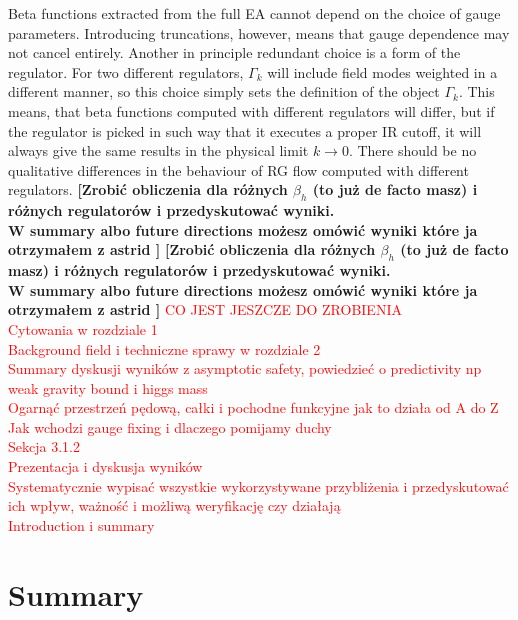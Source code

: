 \documentclass[11pt, a4paper]{article}
\newcommand{\jhkbf}[1]{\textbf{\color{red} [#1]}}
\newcommand{\jhkbf}[1]{\textbf{\color{red} [#1]}}
\begin{document}
Beta functions extracted from the full EA cannot depend on the choice of gauge parameters.
Introducing truncations, however, means that gauge dependence may not cancel entirely.
Another in principle redundant choice is a form of the regulator. For two different regulators,
$\Gamma_k$ will include field modes weighted in a different manner, so this choice simply
sets the definition of the object $\Gamma_k$. 
This means, that beta functions computed with different regulators will differ, but
if the regulator is picked in such way that it executes a proper IR cutoff,
it will always give the same results in the physical limit $k \rightarrow 0$. There should be no
qualitative differences in the behaviour of RG flow computed with different regulators.
\jhkbf{Zrobić obliczenia dla różnych $\beta_h$ (to już de facto masz) i różnych regulatorów i przedyskutować wyniki.\\ 
W summary albo future directions możesz omówić wyniki które ja otrzymałem z astrid
}
\jhkbf{Zrobić obliczenia dla różnych $\beta_h$ (to już de facto masz) i różnych regulatorów i przedyskutować wyniki.\\ 
W summary albo future directions możesz omówić wyniki które ja otrzymałem z astrid
}
\textcolor{red}{
CO JEST JESZCZE DO ZROBIENIA\\
Cytowania w rozdziale 1\\
Background field i techniczne sprawy w rozdziale 2\\
Summary dyskusji wyników z asymptotic safety, powiedzieć o predictivity np weak gravity bound i higgs mass\\
Ogarnąć przestrzeń pędową, całki i pochodne funkcyjne jak to działa od A do Z\\
Jak wchodzi gauge fixing i dlaczego pomijamy duchy\\
Sekcja 3.1.2\\
Prezentacja i dyskusja wyników\\
Systematycznie wypisać wszystkie wykorzystywane przybliżenia i przedyskutować ich wpływ, ważność i możliwą weryfikację czy działają\\
Introduction i summary
}


\section*{Summary}
\end{document}
